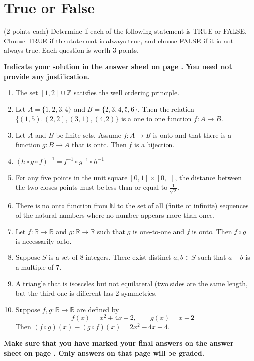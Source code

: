 \documentclass[12pt]{article}
\begin{document}
\newpage
\section*{True or False}

(2 points each) Determine if each of the following statement is TRUE or FALSE.\\Choose TRUE if the statement is always true, and choose FALSE if it is not always true. Each question is worth 3 points.

\vspace{0.2cm}

\noindent
\textbf{Indicate your solution in the answer sheet on page \pageref{answersheet}.  You need not provide any justification.}


\begin{enumerate}
\item The set $[1,2]\cup\mathbb{Z}$ satisfies the well ordering principle.
\vspace{0.6cm}
\item Let $A=\{1,2,3,4\}$ and $B=\{2,3,4,5,6\}$. Then the relation $\{(1,5), (2,2), (3,1),(4,2)\}$ is a one to one function $f:A\to B$.
\vspace{0.6cm}
\item Let $A$ and $B$ be finite sets. Assume $f:A\to B$ is onto and that there is a function $g:B\to A$ that is onto. Then $f$ is a bijection.
\vspace{0.6cm}
\item $(h\circ g\circ f)^{-1}=f^{-1}\circ g^{-1}\circ h^{-1}$
\vspace{0.6cm}
\item For any five points in the unit square $[0,1]\times[0,1]$, the distance between the two closes points must be less than or equal to $\frac{1}{\sqrt{2}}$.
\vspace{0.6cm}
\item There is no onto function from $\mathbb{N}$ to the set of all (finite or infinite) sequences of the natural numbers where no number appears more than once.
\vspace{0.6cm}
\item Let $f:\mathbb{R}\to\mathbb{R}$ and $g:\mathbb{R}\to\mathbb{R}$ such that $g$ is one-to-one and $f$ is onto. Then $f\circ g$ is necessarily onto.
\vspace{0.6cm}
\item Suppose $S$ is a set of $8$ integers. There exist distinct $a, b \in S$ such that $a - b$ is a multiple of $7$.
\vspace{0.6cm}
\item A triangle that is isosceles but not equilateral (two sides are the same length, but the third one is different has $2$ symmetries.
\vspace{0.6cm}
\item Suppose $f,g:\mathbb{R}\to\mathbb{R}$ are defined by
\[
f(x)=x^2+4x-2,\qquad g(x)=x+2
\]
Then $(f\circ g)(x)-(g\circ f)(x)=2x^2-4x+4$.
\end{enumerate}
\begin{center}
\textbf{Make sure that you have marked your final answers on the answer sheet on page \pageref{answersheet}. Only answers on that page will be graded.}
\end{center}
\newpage
\end{document}
